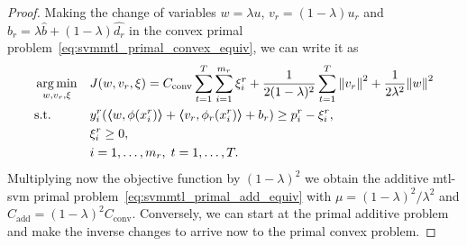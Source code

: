 \begin{proof}
    Making the change of variables $w = \lambda u$, $v_r = (1 - \lambda)u_r$ and $b_r = \lambda \hat{b} + (1 - \lambda) \hat{d_r}$ in the convex primal problem~\eqref{eq:svmmtl_primal_convex_equiv}, we can write it as 
        \begin{equation*}
            \begin{aligned}
            & \operatorname*{arg\min}_{w, v_r, \xi}
            & & {J(w, v_r, \xi) = C_\text{conv} \sum_{t= 1}^T \sum_{i=1}^{m_r}{\xi_{i}^r} + \frac{1}{2 (1-\lambda)^2} \sum_{t= 1}^T{\left\lVert v_r\right\rVert^2} + \frac{1}{2 \lambda^2} {\left\lVert w\right\rVert}^2} \\
            & \text{s.t.}
            & & y_{i}^r (\bm{\left\langle} w, \phi(x_{i}^r) \bm{\right\rangle}  + \bm{\left\langle} v_r, \phi_r(x_{i}^r) \bm{\right\rangle} + b_r) \geq p_{i}^r - \xi_{i}^r , \\
            & & & \xi_{i}^r \geq 0,  \\
            & & & i=1,\dotsc,m_r, \;  t= 1,\dotsc,T .
            \end{aligned}
        \end{equation*}
    Multiplying now the objective function by $(1 - \lambda)^2$ we obtain the additive \acrshort{mtl}-\acrshort{svm} primal problem~\eqref{eq:svmmtl_primal_add_equiv} with $\mu =(1 - \lambda)^2 / \lambda^2$ and $C_\text{add} = (1-\lambda)^2 C_\text{conv}$.
    Conversely, we can start at the primal additive problem and make the inverse changes to arrive now to the primal convex problem.
\end{proof}


